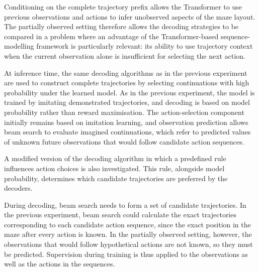 ﻿\documentclass[12pt,a4paper]{article}
\theoremstyle{definition}
\begin{document}
Conditioning on the complete
trajectory prefix allows the Transformer to use previous observations and actions to
infer unobserved aspects of the maze layout. The partially observed setting therefore
allows the decoding strategies to be compared in a problem where an advantage of the
Transformer-based sequence-modelling framework is particularly relevant: its ability to
use trajectory context when the current observation alone is insufficient for selecting
the next action.

At inference time, the same decoding algorithms as in the previous experiment are
used to construct complete trajectories by selecting continuations with high probability
under the learned model. As in the previous experiment, the model is trained by
imitating demonstrated trajectories, and decoding is based on model probability rather
than reward maximisation. The action-selection component initially remains based on
imitation learning, and observation prediction allows beam search to evaluate imagined
continuations, which refer to predicted values of unknown future observations that 
would follow candidate action sequences. 

A modified version of the decoding algorithm in which a predefined rule influences action choices
is also investigated. This rule, alongside model probability, determines which candidate trajectories
are preferred by the decoders.

During decoding, beam search needs to form a set of candidate trajectories. In the previous experiment,
beam search could calculate the exact trajectories corresponding to each candidate action sequence, 
since the exact position in the maze after every action is known. In the partially observed setting, however,
the observations that would follow hypothetical actions are not known, so they must be
predicted.
Supervision during training is thus applied to the observations as well as the actions in 
the sequences. 
\end{document}
